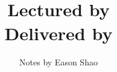 \title{\Part\space\Course \\ \vspace{0.5em}
\Large{Lectured by \Lecturer} \\ \vspace{0.5em}
\Large{Delivered by \Department}}
\author{Notes by Eason Shao}
\date{\Term\space\Year}